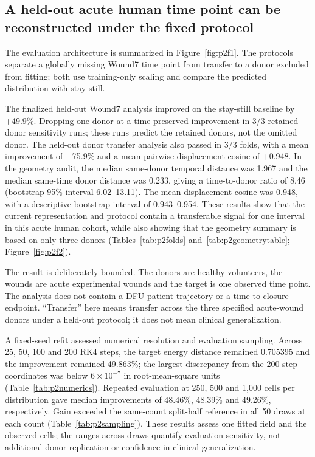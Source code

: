 \subsection{A held-out acute human time point can be reconstructed under the fixed protocol}

The evaluation architecture is summarized in Figure~\ref{fig:p2f1}\label{call:p2f1}. The protocols separate a globally missing Wound7 time point from transfer to a donor excluded from fitting; both use training-only scaling and compare the predicted distribution with stay-still.


The finalized held-out Wound7 analysis improved on the stay-still baseline by +49.9\%. Dropping one donor at a time preserved improvement in 3/3 retained-donor sensitivity runs; these runs predict the retained donors, not the omitted donor. The held-out donor transfer analysis also passed in 3/3 folds, with a mean improvement of +75.9\% and a mean pairwise displacement cosine of +0.948. In the geometry audit, the median same-donor temporal distance was 1.967 and the median same-time donor distance was 0.233, giving a time-to-donor ratio of 8.46 (bootstrap 95\% interval 6.02--13.11). The mean displacement cosine was 0.948, with a descriptive bootstrap interval of 0.943--0.954. These results show that the current representation and protocol contain a transferable signal for one interval in this acute human cohort, while also showing that the geometry summary is based on only three donors (Tables~\ref{tab:p2folds} and~\ref{tab:p2geometrytable}; Figure~\ref{fig:p2f2}\label{call:p2f2}).



The result is deliberately bounded. The donors are healthy volunteers, the wounds are acute experimental wounds and the target is one observed time point. The analysis does not contain a DFU patient trajectory or a time-to-closure endpoint. ``Transfer'' here means transfer across the three specified acute-wound donors under a held-out protocol; it does not mean clinical generalization.

A fixed-seed refit assessed numerical resolution and evaluation sampling. Across 25, 50, 100 and 200 RK4 steps, the target energy distance remained 0.705395 and the improvement remained 49.863\%; the largest discrepancy from the 200-step coordinates was below $6\times10^{-7}$ in root-mean-square units (Table~\ref{tab:p2numerics}). Repeated evaluation at 250, 500 and 1,000 cells per distribution gave median improvements of 48.46\%, 48.39\% and 49.26\%, respectively. Gain exceeded the same-count split-half reference in all 50 draws at each count (Table~\ref{tab:p2sampling}). These results assess one fitted field and the observed cells; the ranges across draws quantify evaluation sensitivity, not additional donor replication or confidence in clinical generalization.

